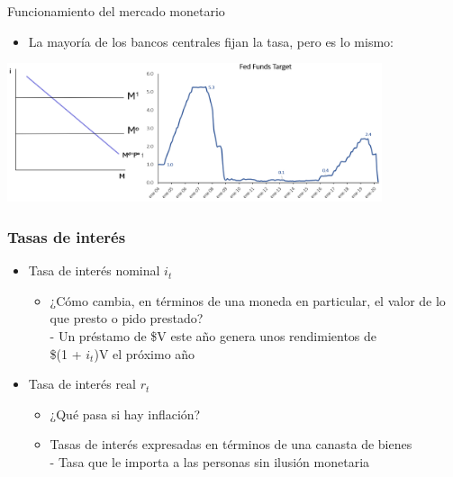 \documentclass{beamer}
\begin{document}
\begin{frame}{Funcionamiento del mercado monetario}
    \begin{itemize}
    \item La mayoría de los bancos centrales fijan la tasa, pero es lo mismo:
    \end{itemize}
    \vspace{0.4cm}
    \centering\includegraphics[width=11cm]{Figures/P63.png}\\
\end{frame}

\begin{frame}
\frametitle{Tasas de interés}
\begin{itemize}
    \item Tasa de interés nominal $i_t$
    \begin{itemize}
        \item ¿Cómo cambia, en términos de una moneda en particular, el valor de lo que presto o pido prestado? \\
        - Un préstamo de \$V este año genera unos rendimientos de \\ \$(1 + $i_t$)V el próximo año
    \end{itemize} \vspace{4mm}
    \item Tasa de interés real $r_t$
    \begin{itemize}
        \item ¿Qué pasa si hay inflación?
        \item Tasas de interés expresadas en términos de una canasta de bienes \\
        - Tasa que le importa a las personas sin ilusión monetaria
        \end{itemize}
    \end{itemize}
\end{frame}

\end{document}

